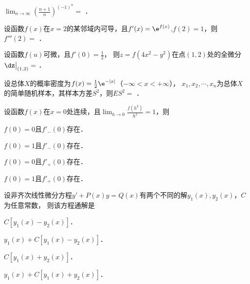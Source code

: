 \documentclass[plain,noanswer,medmath]{../../template/jnuexam}
\begin{document}






\begin{problem}
$\lim_{n \to \infty} \left(\frac{n + 1}{n} \right)^{(- 1)^n} =$ \fillin{}．
\end{problem}


\begin{problem}
设函数$f(x)$在$x = 2$的某邻域内可导，且$f'(x) = \e^{f(x)}$,$f(2) = 1$，则$f'''(2) =$ \fillin{}．
\end{problem}


\begin{problem}
设函数$f(u)$可微，且$f'(0) = \frac{1}{2}$，
则$z = f\left(4x^2 - y^2 \right)$在点$(1,2)$处的全微分$\dz\big|_{\left(1,2 \right)} =$ \fillin{}．
\end{problem}






\begin{problem}
设总体$X$的概率密度为$f(x) = \frac{1}{2}\e^{- |x|}$（$-\infty < x < +\infty$），
$x_1,x_2, \cdots ,x_n$为总体$X$的简单随机样本，其样本方差$S^2$，则$ES^2 =$ \fillin{}．
\end{problem}






\begin{problem}
设函数$f(x)$在$x = 0$处连续，且$\lim_{h \to 0}\frac{f\left(h^2\right)}{h^2} = 1$，则\pickout{}
\begin{abcd}
\item $f(0) = 0$且$f'_-(0)$存在．
\item $f(0) = 1$且$f'_-(0)$存在．
\item $f(0) = 0$且$f'_+(0)$存在．
\item $f(0) = 1$且$f'_+(0)$存在．
\end{abcd}
\end{problem}




\begin{problem}
设非齐次线性微分方程$y' + P(x)y = Q(x)$有两个不同的解$y_1(x),y_2(x)$，$C$为任意常数，
则该方程通解是\pickout{}
\begin{abcd}
\item $C\left[y_1(x) - y_2(x) \right]$．
\item $y_1(x) + C\left[y_1(x) - y_2(x) \right]$．
\item $C\left[y_1(x) + y_2(x) \right]$．
\item $y_1(x) + C\left[y_1(x) + y_2(x) \right]$．
\end{abcd}
\end{problem}
\end{document}
